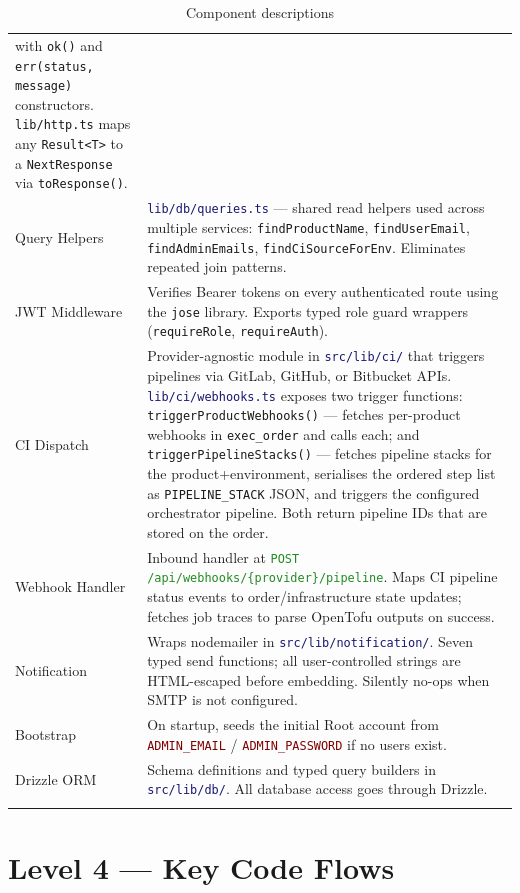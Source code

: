 \documentclass[12pt,a4paper,twoside]{report}
\newcommand{\code}[1]{\texttt{#1}}
\newcommand{\file}[1]{\texttt{\textcolor{MidnightBlue}{#1}}}
\newcommand{\route}[1]{\texttt{\textcolor{ForestGreen}{#1}}}
\newcommand{\env}[1]{\texttt{\textcolor{Maroon}{#1}}}
\begin{document}
\begin{longtable}{@{}L{3.2cm}L{9.8cm}@{}}
    with \code{ok()} and \code{err(status, message)} constructors.
    \code{lib/http.ts} maps any \code{Result<T>} to a \code{NextResponse}
    via \code{toResponse()}. \\[4pt]
  Query Helpers &
    \file{lib/db/queries.ts} — shared read helpers used across multiple services:
    \code{findProductName}, \code{findUserEmail}, \code{findAdminEmails},
    \code{findCiSourceForEnv}. Eliminates repeated join patterns. \\[4pt]
  JWT Middleware &
    Verifies Bearer tokens on every authenticated route using the
    \code{jose} library. Exports typed role guard wrappers
    (\code{requireRole}, \code{requireAuth}). \\[4pt]
  CI Dispatch &
    Provider-agnostic module in \file{src/lib/ci/} that triggers pipelines via
    GitLab, GitHub, or Bitbucket APIs. \file{lib/ci/webhooks.ts} exposes two
    trigger functions: \code{triggerProductWebhooks()} — fetches per-product webhooks
    in \code{exec\_order} and calls each; and \code{triggerPipelineStacks()} —
    fetches pipeline stacks for the product+environment, serialises the ordered step
    list as \code{PIPELINE\_STACK} JSON, and triggers the configured orchestrator
    pipeline. Both return pipeline IDs that are stored on the order. \\[4pt]
  Webhook Handler &
    Inbound handler at \route{POST /api/webhooks/\{provider\}/pipeline}.
    Maps CI pipeline status events to order/infrastructure state updates;
    fetches job traces to parse OpenTofu outputs on success. \\[4pt]
  Notification &
    Wraps nodemailer in \file{src/lib/notification/}. Seven typed send functions;
    all user-controlled strings are HTML-escaped before embedding.
    Silently no-ops when SMTP is not configured. \\[4pt]
  Bootstrap &
    On startup, seeds the initial Root account from
    \env{ADMIN\_EMAIL} / \env{ADMIN\_PASSWORD} if no users exist. \\[4pt]
  Drizzle ORM &
    Schema definitions and typed query builders in
    \file{src/lib/db/}. All database access goes through Drizzle. \\
  \bottomrule
  \caption{Component descriptions}
  \label{tab:components}
\end{longtable}

\section{Level 4 — Key Code Flows}
\label{sec:c4-l4}
\end{document}
